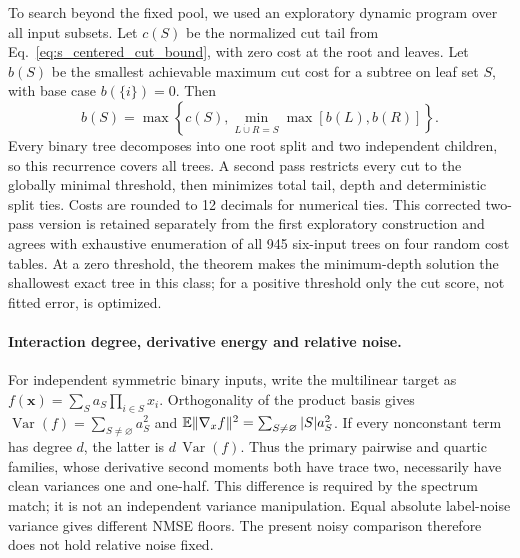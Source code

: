 To search beyond the fixed pool, we used an exploratory dynamic program
over all input subsets. Let $c(S)$ be the normalized cut tail from
Eq.~\ref{eq:s_centered_cut_bound}, with zero cost at the root and leaves.
Let $b(S)$ be the smallest achievable maximum cut cost for a subtree on
leaf set $S$, with base case $b(\{i\})=0$. Then
\begin{equation}
 b(S)=\max\left\{c(S),\min_{L\dot\cup R=S}
                            \max[b(L),b(R)]\right\}.
 \label{eq:s_tree_minimax_dp}
\end{equation}
Every binary tree decomposes into one root split and two independent
children, so this recurrence covers all trees. A second pass restricts every
cut to the globally minimal threshold, then minimizes total tail, depth and
deterministic split ties. Costs are rounded to 12 decimals for numerical
ties. This corrected two-pass version is retained separately from the first
exploratory construction and agrees with exhaustive enumeration of all 945
six-input trees on four random cost tables. At a zero threshold, the theorem
makes the minimum-depth solution the shallowest exact tree in this class;
for a positive threshold only the cut score, not fitted error, is optimized.

\paragraph{Interaction degree, derivative energy and relative noise.}
\label{sec:degree_relative_noise}
For independent symmetric binary inputs, write the multilinear target as
$f(\bm x)=\sum_S a_S\prod_{i\in S}x_i$. Orthogonality of the product basis gives
$\operatorname{Var}(f)=\sum_{S\ne\varnothing}a_S^2$ and
$\mathbb{E}\|\nabla_x f\|^2=\sum_{S\ne\varnothing}|S|a_S^2$.
If every nonconstant term has degree $d$, the latter is
$d\,\operatorname{Var}(f)$. Thus the primary pairwise and quartic families,
whose derivative second moments both have trace two, necessarily have clean
variances one and one-half. This difference is required by the spectrum match;
it is not an independent variance manipulation. Equal absolute label-noise
variance gives different NMSE floors. The present noisy comparison therefore
does not hold relative noise fixed.

